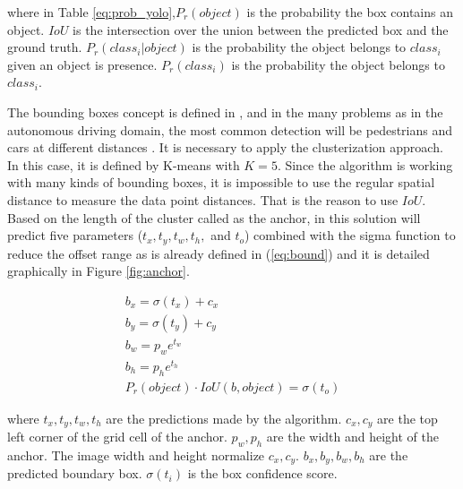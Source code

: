 where in Table \ref{eq:prob_yolo},$P_r(object)$ is the probability the box contains an object.
$IoU$ is the intersection over the union between the predicted box and the ground truth.
$P_r(class_i|object)$ is the probability the object belongs to $class_i$ given an object is presence.
$P_r(class_i)$ is the probability the object belongs to $class_i$.

The bounding boxes concept is defined in \cite{redmon2017yolo9000}, and in the many problems as in the autonomous driving domain, the most common detection will be pedestrians and cars at different distances \cite{ess2010object}.  It is necessary to apply the clusterization approach. In this case, it is defined by K-means with $K=5$. Since the algorithm is working with many kinds of bounding boxes, it is impossible to use the regular spatial distance to measure the data point distances. That is the reason to use $IoU$. Based on the length of the cluster called as the anchor, in this solution will predict five parameters ($t_x, t_y, t_w, t_h,$ and $t_o$) combined with the sigma function to reduce the offset range as is already defined in (\ref{eq:bound}) and it is detailed graphically in Figure \ref{fig:anchor}.


    
    \begin{equation}
    \label{eq:bound}
    \begin{aligned}
        b_x = \sigma(t_x) + c_x \\
        b_y = \sigma(t_y) + c_y \\
        b_w = p_we^{t_w} \\
        b_h = p_he^{t_h} \\
        P_r(object)\cdot IoU(b,object) = \sigma(t_o)
    \end{aligned}
    \end{equation}

where $t_x, t_y, t_w, t_h$ are the predictions made by the algorithm. 
$c_x, c_y$ are the top left corner of the grid cell of the anchor.
$p_w, p_h$ are the width and height of the anchor. 
The image width and height normalize $ c_x, c_y$. 
$b_x, b_y, b_w, b_h$ are the predicted boundary box. 
$\sigma(t_i)$ is the box confidence score.

